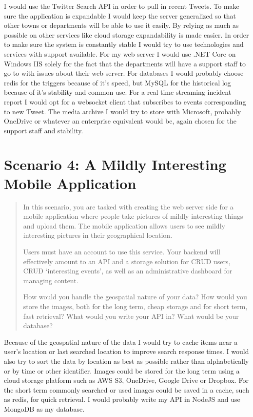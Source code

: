 \documentclass[12pt, letterpaper]{homework}
\begin{document}
I would use the Twitter Search API in order to pull in recent Tweets. To make
sure the application is expandable I would keep the server generalized so that
other towns or departments will be able to use it easily. By relying as much as
possible on other services like cloud storage expandability is made easier. In
order to make sure the system is constantly stable I would try to use
technologies and services with support available. For my web server I would use
\@.NET Core on Windows IIS solely for the fact that the departments will have a
support staff to go to with issues about their web server. For databases I would
probably choose redis for the triggers because of it's speed, but MySQL for the
historical log because of it's stability and common use. For a real time
streaming incident report I would opt for a websocket client that subscribes to
events corresponding to new Tweet. The media archive I would try to store with
Microsoft, probably OneDrive or whatever an enterprise equivalent would be,
again chosen for the support staff and stability.

\pagebreak{}
\section*{Scenario 4: A Mildly Interesting Mobile Application}

\begin{quote}
    In this scenario, you are tasked with creating the web server side for a mobile
    application where people take pictures of mildly interesting things and upload
    them. The mobile application allows users to see mildly interesting pictures in
    their geographical location.

    Users must have an account to use this service. Your backend will effectively
    amount to an API and a storage solution for CRUD users, CRUD `interesting
    events', as well as an administrative dashboard for managing content.

    How would you handle the geospatial nature of your data? How would you store the
    images, both for the long term, cheap storage and for short term, fast
    retrieval? What would you write your API in? What would be your database?
\end{quote}

Because of the geospatial nature of the data I would try to cache items near a
user's location or last searched location to improve search response times. I
would also try to sort the data by location as best as possible rather than
alphabetically or by time or other identifier. Images could be stored for the
long term using a cloud storage platform such as AWS S3, OneDrive, Google Drive
or Dropbox. For the short term commonly searched or used images could be saved
in a cache, such as redis, for quick retrieval. I would probably write my API in
NodeJS and use MongoDB as my database.
\end{document}

